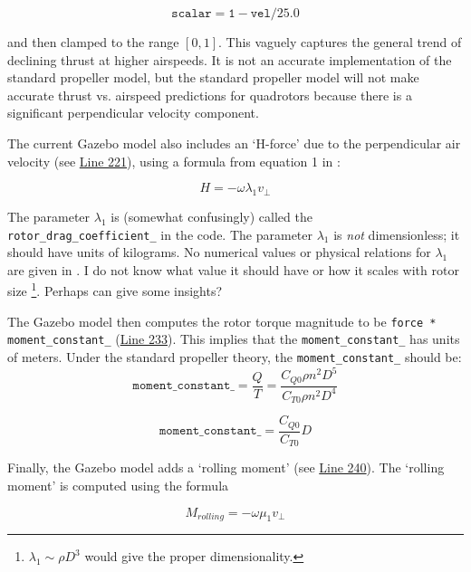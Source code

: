 \documentclass[12pt]{article}
\begin{document}
\[
\mathtt{scalar = 1 - vel / 25.0}
\]

and then clamped to the range $[0, 1]$. This vaguely captures the general trend of declining thrust at higher airspeeds. It is not an accurate implementation of the standard propeller model, but the standard propeller model will not make accurate thrust vs. airspeed predictions for quadrotors because there is a significant perpendicular velocity component.

The current Gazebo model also includes an `H-force' due to the perpendicular air velocity (see \href{https://github.com/PX4/sitl_gazebo/blob/d08eb5b22d3edfb7a740c883b06f895a173b5519/src/gazebo_motor_model.cpp#L221}{Line 221}), using a formula from equation 1 in \cite{martin:hal-00422423}:

\begin{equation}
H = - \omega \lambda_1 v_{\perp}
\end{equation}

The parameter $\lambda_1$ is (somewhat confusingly) called the \texttt{rotor\_drag\_coefficient\_} in the code.
The parameter $\lambda_1$ is \emph{not} dimensionless; it should have units of kilograms. No numerical values or physical relations for $\lambda_1$ are given in \cite{martin:hal-00422423}.
I do not know what value it should have or how it scales with rotor size \footnote{$\lambda_1 \sim \rho D^3$ would give the proper dimensionality.}. Perhaps \cite{2016arXiv160100733B} can give some insights?

The Gazebo model then computes the rotor torque magnitude to be \texttt{force * moment\_constant\_} (\href{https://github.com/PX4/sitl_gazebo/blob/d08eb5b22d3edfb7a740c883b06f895a173b5519/src/gazebo_motor_model.cpp#L233}{Line 233}). This implies that the \texttt{moment\_constant\_} has units of meters. Under the standard propeller theory, the \texttt{moment\_constant\_} should be:
\[
\mathtt{moment\_constant\_} = \frac{Q}{T} = \frac{C_{Q0} \rho n^2 D^5}{C_{T0} \rho n^2 D^4}
\]

\begin{equation}
\mathtt{moment\_constant\_} = \frac{C_{Q0}}{C_{T0}} D
\end{equation}

Finally, the Gazebo model adds a `rolling moment' (see \href{https://github.com/PX4/sitl_gazebo/blob/d08eb5b22d3edfb7a740c883b06f895a173b5519/src/gazebo_motor_model.cpp#L240}{Line 240}). The `rolling moment' is computed using the formula

\begin{equation}
M_{rolling} = - \omega \mu_1 v_\perp
\end{equation}
\end{document}
